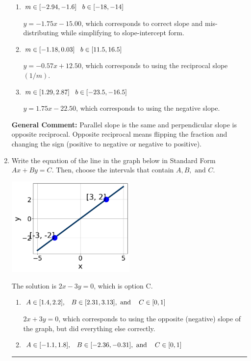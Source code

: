 \documentclass{extbook}[14pt]
\newcommand{\litem}[1]{\item #1

\rule{\textwidth}{0.4pt}}
\begin{document}
\begin{enumerate}
{\begin{enumerate}[label=\Alph*.]
 $y = -1.75x - 12.50$, which corresponds to using the correct slope and getting the negative $y$-intercept.
\item \( m \in [-2.94, -1.6] \hspace*{3mm} b \in [-18, -14] \)

 $y = -1.75x - 15.00$, which corresponds to correct slope and mis-distributing while simplifying to slope-intercept form.
\item \( m \in [-1.18, 0.03] \hspace*{3mm} b \in [11.5, 16.5] \)

 $y = -0.57x + 12.50$, which corresponds to using the reciprocal slope $(1/m)$.
\item \( m \in [1.29, 2.87] \hspace*{3mm} b \in [-23.5, -16.5] \)

 $y = 1.75x - 22.50$, which corresponds to using the negative slope.
\end{enumerate}

\textbf{General Comment:} Parallel slope is the same and perpendicular slope is opposite reciprocal. Opposite reciprocal means flipping the fraction and changing the sign (positive to negative or negative to positive).
}
\litem{
Write the equation of the line in the graph below in Standard Form $Ax+By=C$. Then, choose the intervals that contain $A, B, \text{ and } C$.

\begin{center}
    \includegraphics[width=0.5\textwidth]{../Figures/linearGraphToStandardCopyA.png}
\end{center}


The solution is \( 2x - 3y = 0 \), which is option C.\begin{enumerate}[label=\Alph*.]
\item \( A \in [1.4, 2.2], \hspace{3mm} B \in [2.31, 3.13], \text{ and } \hspace{3mm} C \in [0, 1] \)

 $2x + 3y = 0$, which corresponds to using the opposite (negative) slope of the graph, but did everything else correctly.
\item \( A \in [-1.1, 1.8], \hspace{3mm} B \in [-2.36, -0.31], \text{ and } \hspace{3mm} C \in [0, 1] \)


\end{enumerate}}
\end{enumerate}
\end{document}
